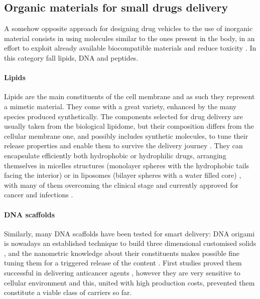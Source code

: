 \subsection{Organic materials for small drugs delivery} \label{sec:organic}

A somehow opposite approach for designing drug vehicles to the use of inorganic material consists in using molecules similar to the ones present in the body, in an effort to exploit already available biocompatible materials and reduce toxicity \cite{Yoo2011}. In this category fall lipids, DNA and peptides.

\paragraph{Lipids} Lipids are the main constituents of the cell membrane and as such they represent a mimetic material. They come with a great variety, enhanced by the many species produced synthetically. The components selected for drug delivery are usually taken from the biological lipidome, but their composition differs from the cellular membrane one, and possibly includes synthetic molecules, to tune their release properties and enable them to survive the delivery journey \cite{Yingchoncharoen2016}. They can encapsulate efficiently both hydrophobic or hydrophilic drugs, arranging themselves in micelles structures (monolayer spheres with the hydrophobic tails facing the interior) or in liposomes (bilayer spheres with a water filled core) \cite{Bunker2016}, with many of them overcoming the clinical stage and currently approved for cancer and infections \cite{Pattni2015paper, Jain2017}.

\paragraph{DNA scaffolds} Similarly, many DNA scaffolds have been tested for smart delivery: DNA origami is nowadays an established technique to build three dimensional customised solids \cite{Linko2015}, and the nanometric knowledge about their constituents makes possible fine tuning them for a triggered release of the content \cite{Douglas2012}. First studies proved them successful in delivering anticancer agents \cite{Zhang2014, Jiang2012}, however they are very sensitive to cellular environment and this, united with high production costs, prevented them constitute a viable class of carriers so far.

